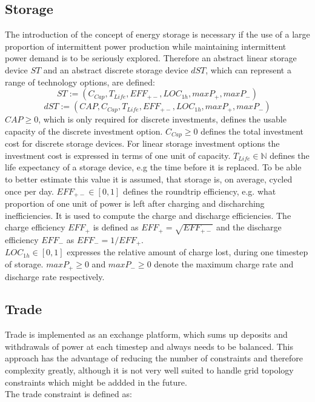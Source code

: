 \documentclass[
	11pt,								%
	DIV10,								%
	a4paper,         					%
	oneside,							%
	headheight=20pt,					%
	footheight=20pt,					%
    parskip=full,						%
    listof=totoc,						%
	bibliography=totoc,					%
	index=totoc,						%
]{scrartcl}
\begin{document}
\subsection{Storage}
The introduction of the concept of energy storage is necessary if the use of a large proportion of intermittent power production while maintaining intermittent power demand is to be seriously explored.
Therefore an abstract linear storage device $ST$ and an abstract discrete storage device $dST$, which can represent a range of technology options, are defined:\\
	\begin{equation}
		ST := (C_{Cap}, T_{Life}, EFF_{+-}, LOC_{1h}, maxP_{+}, maxP_{-})
	\end{equation}
	\begin{equation}
		dST := (CAP, C_{Cap}, T_{Life}, EFF_{+-}, LOC_{1h}, maxP_{+}, maxP_{-})
	\end{equation}
	$CAP \geq 0$, which is only required for discrete investments, defines the usable capacity of the discrete investment option.
	$C_{Cap} \geq 0$ defines the total investment cost for discrete storage devices. For linear storage investment options the investment cost is expressed in terms of one unit of capacity.
	$T_{Life} \in \mathbb{N}$ defines the life expectancy of a storage device, e.g the time before it is replaced. To be able to better estimate this value it is assumed, that storage is, on average, cycled once per day.
	$EFF_{+-} \in [0,1]$ defines the roundtrip efficiency, e.g. what proportion of one unit of power is left after charging and discharching inefficiencies. It is used to compute the charge and discharge efficiencies.
	The charge efficiency $EFF_{+}$ is defined as $EFF_{+} = \sqrt{EFF_{+-}}$ and the discharge efficiency $EFF_{-}$ as $EFF_{-} = 1/EFF_{+}$.\\
	$LOC_{1h} \in [0,1]$ expresses the relative amount of charge lost, during one timestep of storage.
	$maxP_{+} \geq 0$ and $maxP_{-} \geq 0$ denote the maximum charge rate and discharge rate respectively.





\subsection{Trade}
Trade is implemented as an exchange platform, which sums up deposits and withdrawals of power at each timestep and always needs to be balanced. This approach has the advantage of reducing the number of constraints and therefore complexity greatly, although it is not very well suited to handle grid topology constraints which might be addded in the future.\\
The trade constraint is defined as:
\\
\end{document}
